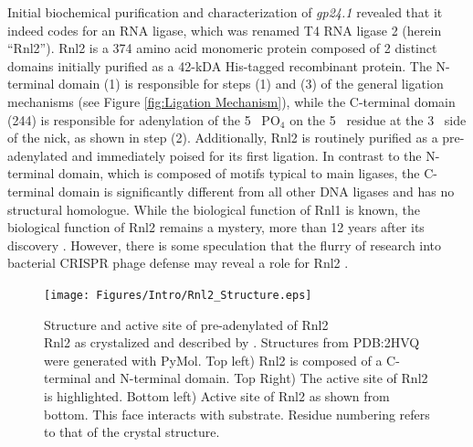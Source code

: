     Initial biochemical purification and characterization of \textit{gp24.1} \citep{Ho2002b} revealed that it indeed codes for an RNA ligase, which was renamed T4 RNA ligase 2 (herein ``Rnl2''). Rnl2 is a 374 amino acid monomeric protein composed of 2 distinct domains initially purified as a 42-kDA His-tagged recombinant protein. The N-terminal domain (1) is responsible for steps (1) and (3) of the general ligation mechanisms (see Figure \ref{fig:Ligation Mechanism}), while the C-terminal domain (244) is responsible for adenylation of the 5\textprime~ PO$_{4}$ on the 5\textprime~ residue at the 3\textprime~ side of the nick, as shown in step (2). Additionally, Rnl2 is routinely purified as a pre-adenylated and immediately poised for its first ligation. In contrast to the N-terminal domain, which is composed of motifs typical to main ligases, the C-terminal domain is significantly  different from all other DNA ligases and has no structural homologue. While the biological function of Rnl1 is known, the biological function of Rnl2 remains a mystery, more than 12 years after its discovery \citep{Chauleau2013b}. However, there is some speculation that the flurry of research into bacterial CRISPR phage defense may reveal a role for Rnl2 \citep{Barrangou2007c,Chauleau2013b}.

    \begin{figure}[htbp] %
      \centering 
      \texttt{[image: Figures/Intro/Rnl2\_Structure.eps]}
      \caption[Structure and active site of pre-adenylated of Rnl2]
      {
        Structure and active site of pre-adenylated of Rnl2\\[0.25cm]
        Rnl2 as crystalized and described by \citep{Nandakumar2006}. Structures from PDB:2HVQ were generated with PyMol. Top left) Rnl2 is composed of a C-terminal and N-terminal domain. Top Right) The active site of Rnl2 is highlighted. Bottom left) Active site of Rnl2 as shown from bottom. This face interacts with substrate. Residue numbering refers to that of the crystal structure.
        }
      \label{fig:Rnl2 General Structure}
      \end{figure}

